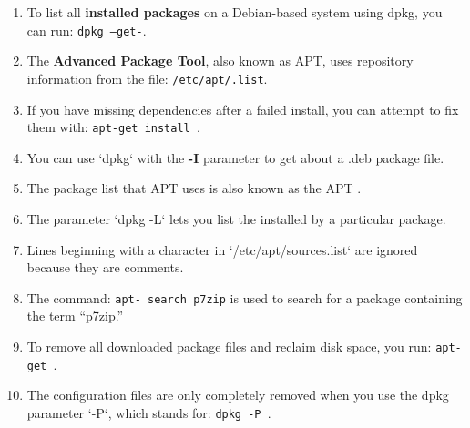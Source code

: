 \documentclass[a4paper]{report}
\begin{document}
\begin{enumerate}[1.]
\item To list all \textbf{installed packages} on a Debian-based system using dpkg, you can run:\newline
\texttt{dpkg --get-\underline{\hspace{2cm}}}.

\item The \textbf{Advanced Package Tool}, also known as APT, uses repository information from the file:\newline
\texttt{/etc/apt/\underline{\hspace{2cm}}.list}.

\item If you have missing dependencies after a failed install, you can attempt to fix them with:\newline
\texttt{apt-get install \underline{\hspace{2cm}}}.

\item You can use `dpkg` with the \textbf{-I} parameter to get \underline{\hspace{2cm}} about a .deb package file.

\item The package list that APT uses is also known as the APT \underline{\hspace{2cm}}.

\item The parameter `dpkg -L` lets you list the \underline{\hspace{2cm}} installed by a particular package.

\item Lines beginning with a \underline{\hspace{2cm}} character in `/etc/apt/sources.list` are ignored because they are comments.

\item The command:\newline
\texttt{apt-\underline{\hspace{2cm}} search p7zip}\newline
is used to search for a package containing the term “p7zip.”

\item To remove all downloaded package files and reclaim disk space, you run:\newline
\texttt{apt-get \underline{\hspace{2cm}}}.

\item The configuration files are only completely removed when you use the dpkg parameter `-P`, which stands for:\newline
\texttt{dpkg -P \underline{\hspace{2cm}}}.

\end{enumerate}
\end{document}
